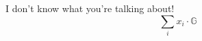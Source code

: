 \documentclass[12pt, a4paper]{article}
\begin{document}
I don't know what you're talking about!
$$
\sum_i x_i \cdot \mathbb{G}
$$
\end{document}
